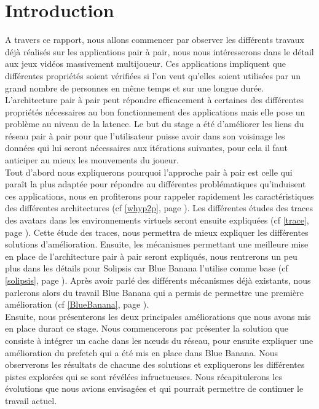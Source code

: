 \section{Introduction}
	A travers ce rapport, nous allons commencer par observer les différents travaux déjà réalisés sur les applications pair à pair, nous nous intéresserons dans le détail aux jeux vidéos massivement multijoueur. Ces applications impliquent que différentes propriétés soient vérifiées si l'on veut qu'elles soient utilisées par un grand nombre de personnes en même temps et sur une longue durée. L'architecture pair à pair peut répondre efficacement à certaines des différentes propriétés nécessaires au bon fonctionnement des applications mais elle pose un problème au niveau de la latence. Le but du stage a été d'améliorer les liens du réseau pair à pair pour que l'utilisateur puisse avoir dans son voisinage les données qui lui seront nécessaires aux itérations suivantes, pour cela il faut anticiper au mieux les mouvements du joueur.\\

	Tout d'abord nous expliquerons pourquoi l'approche pair à pair est celle qui paraît la plus adaptée pour répondre au différentes problématiques qu'induisent ces applications, nous en profiterons pour rappeler rapidement les caractéristiques des différentes architectures (cf \ref{whyp2p}, page \pageref{whyp2p}). Les différentes études des traces des avatars dans les environnements virtuels seront ensuite expliquées (cf \ref{trace}, page \pageref{trace}). Cette étude des traces, nous permettra de mieux expliquer les différentes solutions d'amélioration. Ensuite, les mécanismes permettant une meilleure mise en place de l'architecture pair à pair seront expliqués, nous rentrerons un peu plus dans les détails pour Solipsis car Blue Banana l'utilise comme base (cf \ref{solipsis}, page \pageref{solipsis}). Après avoir parlé des différents mécanismes déjà existants, nous parlerons alors du travail Blue Banana qui a permis de permettre une première amélioration (cf \ref{BlueBanana}, page \pageref{BlueBanana}). \\
	
	Ensuite, nous présenterons les deux principales améliorations que nous avons mis en place durant ce stage. Nous commencerons par présenter la solution que consiste à intégrer un cache dans les nœuds du réseau, pour ensuite expliquer une amélioration du prefetch qui a été mis en place dans Blue Banana. Nous observerons les résultats de chacune des solutions et expliquerons les différentes pistes explorées qui se sont révélées infructueuses. Nous récapitulerons les évolutions que nous avions envisagées et qui pourrait permettre de continuer le travail actuel.

